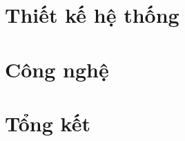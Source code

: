 \documentclass[a4paper, oneside, 12pt]{report}
\theoremstyle{definition}
\begin{document}

\chapter{Thiết kế hệ thống}


\newpage


\newpage


\newpage


\newpage


\newpage



\chapter{Công nghệ}



\chapter{Tổng kết}





\end{document}

